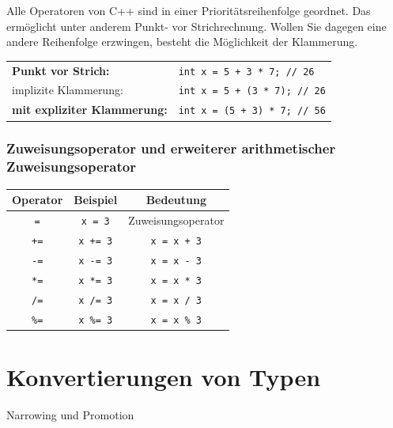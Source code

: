 \documentclass[a4paper]{report}
\begin{document}
Alle Operatoren von C++ sind in einer Prioritätsreihenfolge geordnet. Das ermöglicht unter anderem Punkt- vor Strichrechnung. Wollen Sie dagegen eine andere Reihenfolge erzwingen, besteht die Möglichkeit der Klammerung.
\begin{center}
	\begin{tabular}{|l|l|} \hline
		\textbf{Punkt vor Strich:} & \texttt{int x = 5 + 3 * 7; // 26} \\
		\quad implizite Klammerung: & \texttt{int x = 5 + (3 * 7); // 26} \\ \hline
		\textbf{mit expliziter Klammerung:} & \texttt{int x = (5 + 3) * 7; // 56} \\ \hline
	\end{tabular}
\end{center}

\subsubsection{Zuweisungsoperator und erweiterer arithmetischer Zuweisungsoperator}
\begin{center}
	\begin{tabular}{|c|c|c|} \hline
		\textbf{Operator} &	\textbf{Beispiel} & \textbf{Bedeutung} \\ \hline
		\texttt{=} & \texttt{x = 3} & Zuweisungsoperator \\ \hline
		\texttt{+=} & \texttt{x += 3} & \texttt{x = x + 3} \\ \hline
		\texttt{-=} & \texttt{x -= 3} & \texttt{x = x - 3} \\ \hline
		\texttt{*=} & \texttt{x *= 3} & \texttt{x = x * 3} \\ \hline
		\texttt{/=} & \texttt{x /= 3} & \texttt{x = x / 3} \\ \hline
		\texttt{\%=} & \texttt{x \%= 3} & \texttt{x = x \% 3} \\ \hline	

	\end{tabular}
\end{center}



\section{Konvertierungen von Typen}
Narrowing und Promotion
\end{document}
